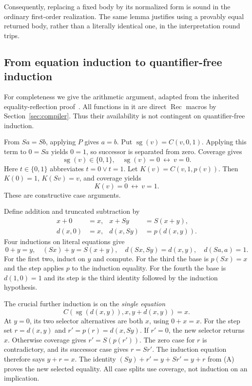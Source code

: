 \documentclass[11pt]{article}
\theoremstyle{definition}
\theoremstyle{remark}
\newcommand{\Rec}{\operatorname{Rec}}
\begin{document}
Consequently, replacing a fixed body by its
normalized form is sound in the ordinary
first-order realization. The same lemma justifies
using a provably equal returned body, rather
than a literally identical one, in the
interpretation round trips.

\subsection{From equation induction to quantifier-free induction}

For completeness we give the arithmetic argument,
adapted from the inherited equality-reflection
proof~\cite{reflection}. All functions in it are
direct $\Rec$ macros by Section~\ref{sec:compiler}.
Thus their availability is not contingent on
quantifier-free induction.

From $Sa=Sb$, applying $P$ gives $a=b$.
Put $\operatorname{sg}(v)=C(v,0,1)$.
Applying this term to $0=Sa$ yields $0=1$,
so successor is separated from zero.
Coverage gives
\[
 \operatorname{sg}(v)\in\{0,1\},\quad
 \operatorname{sg}(v)=0\ \leftrightarrow\ v=0.
\]
Here $t\in\{0,1\}$ abbreviates
$t=0\lor t=1$.
Let $K(v)=C(v,1,p(v))$. Then
$K(0)=1$, $K(Sv)=v$, and coverage yields
\[
 K(v)=0\ \leftrightarrow\ v=1.
\]
These are constructive case arguments.

Define addition and truncated subtraction by
\begin{align*}
 x+0&=x,&x+Sy&=S(x+y),\\
 d(x,0)&=x,&d(x,Sy)&=p(d(x,y)).
\end{align*}
Four inductions on literal equations give
\[
 0+y=y,\quad (Sx)+y=S(x+y),\quad
 d(Sx,Sy)=d(x,y),\quad d(Sa,a)=1.                            \tag{A}
\]
For the first two, induct on $y$ and compute.
For the third the base is $p(Sx)=x$ and the step
applies $p$ to the induction equality.
For the fourth the base is $d(1,0)=1$ and its
step is the third identity followed by the
induction hypothesis.

The crucial further induction is on the
\emph{single equation}
\begin{equation}
 C(\operatorname{sg}(d(x,y)),x,y+d(x,y))=x.
 \label{eq:residual}
\end{equation}
At $y=0$, its two selector alternatives are
both $x$, using $0+x=x$. For the step set
$r=d(x,y)$ and $r'=p(r)=d(x,Sy)$.
If $r'=0$, the new selector returns $x$.
Otherwise coverage gives $r'=S(p(r'))$.
The zero case for $r$ is contradictory, and
its successor case gives $r=Sr'$.
The induction equation therefore says
$y+r=x$. The identity
$(Sy)+r'=y+Sr'=y+r$ from (A) proves the
new selected equality. All case splits use
coverage, not induction on an implication.
\end{document}
